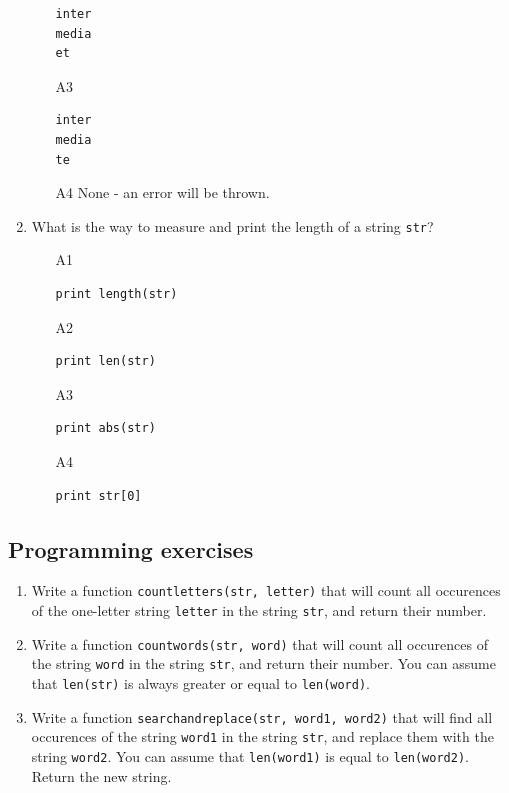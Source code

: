 \begin{enumerate}
\begin{enumerate}
\begin{verbatim}
inter
media
et
\end{verbatim}
\item[A3] 
\begin{verbatim}
inter
media
te
\end{verbatim}
\item[A4] 
None - an error will be thrown.
\end{enumerate}
\item What is the way to measure and print the length of a string {\tt str}?
\begin{enumerate}
\item[A1] 
\begin{verbatim}
print length(str)
\end{verbatim}
\item[A2] 
\begin{verbatim}
print len(str)
\end{verbatim}
\item[A3] 
\begin{verbatim}
print abs(str)
\end{verbatim}
\item[A4] 
\begin{verbatim}
print str[0]
\end{verbatim}
\end{enumerate}
\end{enumerate}

\subsection{Programming exercises}

\begin{enumerate}
\item Write a function {\tt countletters(str, letter)} that will count 
all occurences of the one-letter string {\tt letter} in the string {\tt str}, 
and return their number. 
\item Write a function {\tt countwords(str, word)} that will count 
all occurences of the string {\tt word} in the string {\tt str}, and 
return their number. You can assume that {\tt len(str)} is always greater 
or equal to {\tt len(word)}.
\item Write a function {\tt searchandreplace(str, word1, word2)} that will 
find all occurences of the string {\tt word1} in the string {\tt str}, and 
replace them with the string {\tt word2}. You can assume that {\tt len(word1)} 
is equal to {\tt len(word2)}. Return the new string.
\end{enumerate}



